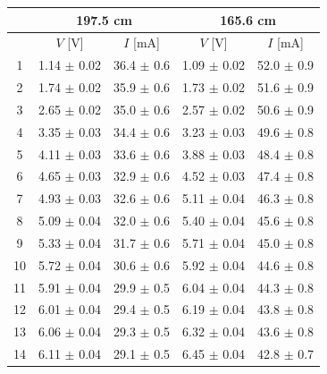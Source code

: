 \documentclass{article}
\begin{document}
{\begin{table}[H]
    \centering
    \begin{tabular}{ccc||cc}
        \toprule
           & \multicolumn{2}{c||}{197.5 cm} & \multicolumn{2}{c}{165.6 cm}                                      \\
        \midrule
           & $V$ [V]                        & $I$ [mA]                     & $V$ [V]          & $I$ [mA]        \\
        \midrule
        1  & 1.14  $\pm$ 0.02               & 36.4  $\pm$ 0.6              & 1.09  $\pm$ 0.02 & 52.0  $\pm$ 0.9 \\
        2  & 1.74  $\pm$ 0.02               & 35.9  $\pm$ 0.6              & 1.73  $\pm$ 0.02 & 51.6  $\pm$ 0.9 \\
        3  & 2.65  $\pm$ 0.02               & 35.0  $\pm$ 0.6              & 2.57  $\pm$ 0.02 & 50.6  $\pm$ 0.9 \\
        4  & 3.35  $\pm$ 0.03               & 34.4  $\pm$ 0.6              & 3.23  $\pm$ 0.03 & 49.6  $\pm$ 0.8 \\
        5  & 4.11  $\pm$ 0.03               & 33.6  $\pm$ 0.6              & 3.88  $\pm$ 0.03 & 48.4  $\pm$ 0.8 \\
        6  & 4.65  $\pm$ 0.03               & 32.9  $\pm$ 0.6              & 4.52  $\pm$ 0.03 & 47.4  $\pm$ 0.8 \\
        7  & 4.93  $\pm$ 0.03               & 32.6  $\pm$ 0.6              & 5.11  $\pm$ 0.04 & 46.3  $\pm$ 0.8 \\
        8  & 5.09  $\pm$ 0.04               & 32.0  $\pm$ 0.6              & 5.40  $\pm$ 0.04 & 45.6  $\pm$ 0.8 \\
        9  & 5.33  $\pm$ 0.04               & 31.7  $\pm$ 0.6              & 5.71  $\pm$ 0.04 & 45.0  $\pm$ 0.8 \\
        10 & 5.72  $\pm$ 0.04               & 30.6  $\pm$ 0.6              & 5.92  $\pm$ 0.04 & 44.6  $\pm$ 0.8 \\
        11 & 5.91  $\pm$ 0.04               & 29.9  $\pm$ 0.5              & 6.04  $\pm$ 0.04 & 44.3  $\pm$ 0.8 \\
        12 & 6.01  $\pm$ 0.04               & 29.4  $\pm$ 0.5              & 6.19  $\pm$ 0.04 & 43.8  $\pm$ 0.8 \\
        13 & 6.06  $\pm$ 0.04               & 29.3  $\pm$ 0.5              & 6.32  $\pm$ 0.04 & 43.6  $\pm$ 0.8 \\
        14 & 6.11  $\pm$ 0.04               & 29.1  $\pm$ 0.5              & 6.45  $\pm$ 0.04 & 42.8  $\pm$ 0.7 \\

\end{tabular}
\end{table}}
\end{document}
